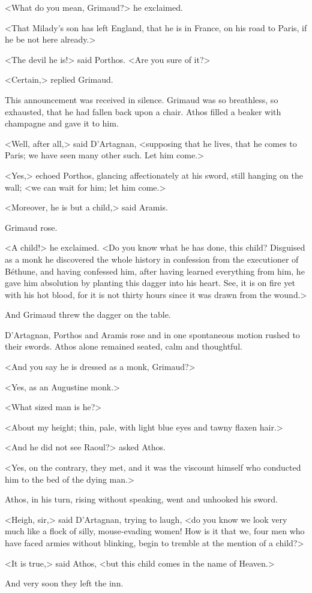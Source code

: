 <What do you mean, Grimaud?> he exclaimed.

<That Milady's son has left England, that he is in France, on his road to Paris, if he be not here already.>

<The devil he is!> said Porthos. <Are you sure of it?>

<Certain,> replied Grimaud.

This announcement was received in silence. Grimaud was so breathless, so exhausted, that he had fallen back upon a chair. Athos filled a beaker with champagne and gave it to him.

<Well, after all,> said D'Artagnan, <supposing that he lives, that he comes to Paris; we have seen many other such. Let him come.>

<Yes,> echoed Porthos, glancing affectionately at his sword, still hanging on the wall; <we can wait for him; let him come.>

<Moreover, he is but a child,> said Aramis.

Grimaud rose.

<A child!> he exclaimed. <Do you know what he has done, this child? Disguised as a monk he discovered the whole history in confession from the executioner of Béthune, and having confessed him, after having learned everything from him, he gave him absolution by planting this dagger into his heart. See, it is on fire yet with his hot blood, for it is not thirty hours since it was drawn from the wound.>

And Grimaud threw the dagger on the table.

D'Artagnan, Porthos and Aramis rose and in one spontaneous motion rushed to their swords. Athos alone remained seated, calm and thoughtful.

<And you say he is dressed as a monk, Grimaud?>

<Yes, as an Augustine monk.>

<What sized man is he?>

<About my height; thin, pale, with light blue eyes and tawny flaxen hair.>

<And he did not see Raoul?> asked Athos.

<Yes, on the contrary, they met, and it was the viscount himself who conducted him to the bed of the dying man.>

Athos, in his turn, rising without speaking, went and unhooked his sword.

<Heigh, sir,> said D'Artagnan, trying to laugh, <do you know we look very much like a flock of silly, mouse-evading women! How is it that we, four men who have faced armies without blinking, begin to tremble at the mention of a child?>

<It is true,> said Athos, <but this child comes in the name of Heaven.>

And very soon they left the inn. 